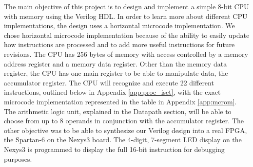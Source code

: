 The main objective of this project is to design and implement a simple 8-bit
CPU with memory using the Verilog HDL. In order to learn more about different
CPU implementations, the design uses a horizontal microcode implementation. We
chose horizontal microcode implementation because of the ability to easily
update how instructions are processed and to add more useful instructions for
future revisions. The CPU has 256 bytes of memory with access controlled by a
memory address register and a memory data register. Other than the memory data
register, the CPU has one main register to be able to manipulate data, the
accumulator register. The CPU will recognize and execute 22 different
instructions, outlined below in Appendix \ref{app:proc_iset}, with the exact
microcode implementation represented in the table in
Appendix \ref{app:mcrom}. The arithmetic logic unit, explained in the Datapath
section, will be able to choose from up to 8 operands in conjunction with the
accumulator register. The other objective was to be able to synthesize our
Verilog design into a real FPGA, the Spartan-6 on the Nexys3 board. The 4-digit,
7-segment LED display on the Nexys3 is programmed to display the full 16-bit
instruction for debugging purposes.
